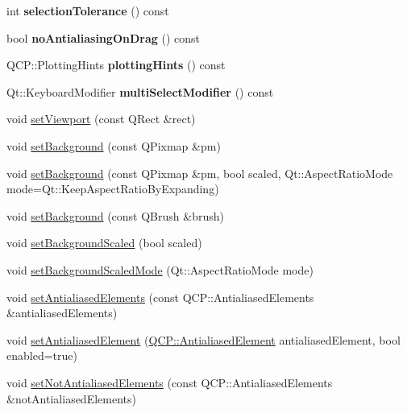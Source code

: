 \begin{DoxyCompactItemize}
int {\bfseries selection\+Tolerance} () const
\item 
\hypertarget{class_q_custom_plot_aca3f01f903fb250a3dd27104d92830be}{}\label{class_q_custom_plot_aca3f01f903fb250a3dd27104d92830be} 
bool {\bfseries no\+Antialiasing\+On\+Drag} () const
\item 
\hypertarget{class_q_custom_plot_ac724f4075822f74f7b676a790095b877}{}\label{class_q_custom_plot_ac724f4075822f74f7b676a790095b877} 
Q\+C\+P\+::\+Plotting\+Hints {\bfseries plotting\+Hints} () const
\item 
\hypertarget{class_q_custom_plot_a28182402ed11609c9a429f0788162d18}{}\label{class_q_custom_plot_a28182402ed11609c9a429f0788162d18} 
Qt\+::\+Keyboard\+Modifier {\bfseries multi\+Select\+Modifier} () const
\item 
void \hyperlink{class_q_custom_plot_a3f9bc4b939dd8aaba9339fd09f273fc4}{set\+Viewport} (const Q\+Rect \&rect)
\item 
void \hyperlink{class_q_custom_plot_a130358592cfca353ff3cf5571b49fb00}{set\+Background} (const Q\+Pixmap \&pm)
\item 
void \hyperlink{class_q_custom_plot_a8513971d6aa24d8b0d6a68d45b542130}{set\+Background} (const Q\+Pixmap \&pm, bool scaled, Qt\+::\+Aspect\+Ratio\+Mode mode=Qt\+::\+Keep\+Aspect\+Ratio\+By\+Expanding)
\item 
void \hyperlink{class_q_custom_plot_a8ed256cf467bfa7ba1f9feaae62c3bd0}{set\+Background} (const Q\+Brush \&brush)
\item 
void \hyperlink{class_q_custom_plot_a36f0fa1317325dc7b7efea615ee2de1f}{set\+Background\+Scaled} (bool scaled)
\item 
void \hyperlink{class_q_custom_plot_a4c0eb4865b7949f62e1cb97db04a3de0}{set\+Background\+Scaled\+Mode} (Qt\+::\+Aspect\+Ratio\+Mode mode)
\item 
void \hyperlink{class_q_custom_plot_af6f91e5eab1be85f67c556e98c3745e8}{set\+Antialiased\+Elements} (const Q\+C\+P\+::\+Antialiased\+Elements \&antialiased\+Elements)
\item 
void \hyperlink{class_q_custom_plot_aeef813bcf7efab8e765f9f87ec454691}{set\+Antialiased\+Element} (\hyperlink{namespace_q_c_p_ae55dbe315d41fe80f29ba88100843a0c}{Q\+C\+P\+::\+Antialiased\+Element} antialiased\+Element, bool enabled=true)
\item 
void \hyperlink{class_q_custom_plot_ae10d685b5eabea2999fb8775ca173c24}{set\+Not\+Antialiased\+Elements} (const Q\+C\+P\+::\+Antialiased\+Elements \&not\+Antialiased\+Elements)
\item 

\end{DoxyCompactItemize}
